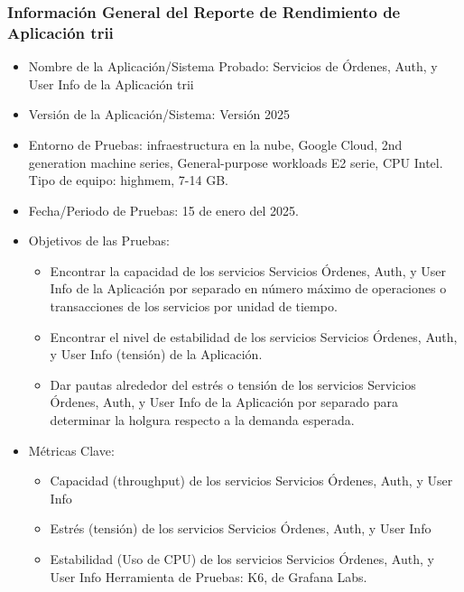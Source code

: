 \documentclass[
  paper=a4,
  ,captions=tableheading
]{scrartcl}
\providecommand{\tightlist}{%
  \setlength{\itemsep}{0pt}\setlength{\parskip}{0pt}}
\begin{document}
\subsubsection{Información General del Reporte de Rendimiento de
Aplicación
trii}\label{sec:informaciuxf3n-general-del-reporte-de-rendimiento-de-aplicaciuxf3n-trii}

\begin{itemize}
\tightlist
\item
  Nombre de la Aplicación/Sistema Probado: Servicios de Órdenes, Auth, y
  User Info de la Aplicación trii
\item
  Versión de la Aplicación/Sistema: Versión 2025
\item
  Entorno de Pruebas: infraestructura en la nube, Google Cloud, 2nd
  generation machine series, General-purpose workloads E2 serie, CPU
  Intel. Tipo de equipo: highmem, 7-14 GB.
\item
  Fecha/Periodo de Pruebas: 15 de enero del 2025.
\item
  Objetivos de las Pruebas:

  \begin{itemize}
  \tightlist
  \item
    Encontrar la capacidad de los servicios Servicios Órdenes, Auth, y
    User Info de la Aplicación por separado en número máximo de
    operaciones o transacciones de los servicios por unidad de tiempo.
  \item
    Encontrar el nivel de estabilidad de los servicios Servicios
    Órdenes, Auth, y User Info (tensión) de la Aplicación.
  \item
    Dar pautas alrededor del estrés o tensión de los servicios Servicios
    Órdenes, Auth, y User Info de la Aplicación por separado para
    determinar la holgura respecto a la demanda esperada.
  \end{itemize}
\item
  Métricas Clave:

  \begin{itemize}
  \tightlist
  \item
    Capacidad (throughput) de los servicios Servicios Órdenes, Auth, y
    User Info
  \item
    Estrés (tensión) de los servicios Servicios Órdenes, Auth, y User
    Info
  \item
    Estabilidad (Uso de CPU) de los servicios Servicios Órdenes, Auth, y
    User Info Herramienta de Pruebas: K6, de Grafana Labs.
  \end{itemize}
\end{itemize}
\end{document}

